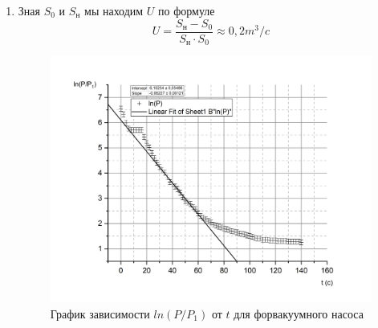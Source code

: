 \documentclass[a4paper, 12pt]{article}%
\begin{document}
\begin{enumerate}
\item Зная $S_0$ и $S_{\text{н}}$ мы находим $U$ по формуле 
\[U = \dfrac{S_{\text{н}} - S_0}{S_{\text{н}} \cdot S_0} \approx 0,2 m^3/c\]
\begin{figure}[h]
\includegraphics[width = \textwidth]{231_4.jpg}
\caption{График зависимости $ln(P/P_1)$ от $t$ для форвакуумного насоса}
\end{figure}
\end{enumerate}
\end{document}
